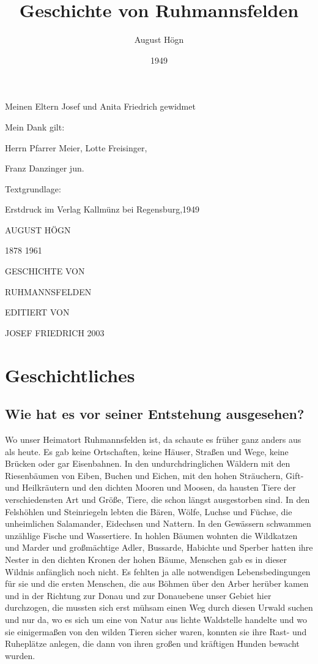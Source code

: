\documentclass[12pt,a4paper]{book}
\author{August Högn}
\title{Geschichte von Ruhmannsfelden}
\date{1949}
\begin{document}
\maketitle

Meinen Eltern Josef und Anita Friedrich gewidmet

Mein Dank gilt:

Herrn Pfarrer Meier, Lotte Freisinger,

Franz Danzinger jun.

Textgrundlage:

Erstdruck im Verlag Kallmünz bei Regensburg,1949

\tableofcontents

\newpage

AUGUST HÖGN

1878 1961

GESCHICHTE VON

RUHMANNSFELDEN

EDITIERT VON

JOSEF FRIEDRICH 2003

\part{Geschichtliches}

\chapter{Wie hat es vor seiner Entstehung ausgesehen?}

Wo unser Heimatort Ruhmannsfelden ist, da schaute es früher ganz anders aus als
heute. Es gab keine Ortschaften, keine Häuser, Straßen und Wege, keine Brücken
oder gar Eisenbahnen. In den undurchdringlichen Wäldern mit den Riesenbäumen von
Eiben, Buchen und Eichen, mit den hohen Sträuchern, Gift- und Heilkräutern und
den dichten Mooren und Moosen, da hausten Tiere der verschiedensten Art und
Größe, Tiere, die schon längst ausgestorben sind. In den Felshöhlen und
Steinriegeln lebten die Bären, Wölfe, Luchse und Füchse, die unheimlichen
Salamander, Eidechsen und Nattern. In den Gewässern schwammen unzählige Fische
und Wassertiere. In hohlen Bäumen wohnten die Wildkatzen und Marder und
großmächtige Adler, Bussarde, Habichte und Sperber hatten ihre Nester in den
dichten Kronen der hohen Bäume, Menschen gab es in dieser Wildnis anfänglich
noch nicht. Es fehlten ja alle notwendigen Lebensbedingungen für sie und die
ersten Menschen, die aus Böhmen über den Arber herüber kamen und in der Richtung
zur Donau und zur Donauebene unser Gebiet hier durchzogen, die mussten sich erst
mühsam einen Weg durch diesen Urwald suchen und nur da, wo es sich um eine von
Natur aus lichte Waldstelle handelte und wo sie einigermaßen von den wilden
Tieren sicher waren, konnten sie ihre Rast- und Ruheplätze anlegen, die dann von
ihren großen und kräftigen Hunden bewacht wurden.
\end{document}
